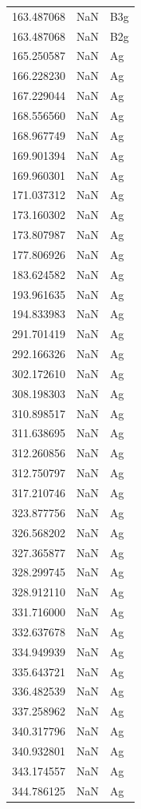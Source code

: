 \begin{longtable}{rrl}
163.487068 & NaN & B3g \\
163.487068 & NaN & B2g \\
165.250587 & NaN & Ag \\
166.228230 & NaN & Ag \\
167.229044 & NaN & Ag \\
168.556560 & NaN & Ag \\
168.967749 & NaN & Ag \\
169.901394 & NaN & Ag \\
169.960301 & NaN & Ag \\
171.037312 & NaN & Ag \\
173.160302 & NaN & Ag \\
173.807987 & NaN & Ag \\
177.806926 & NaN & Ag \\
183.624582 & NaN & Ag \\
193.961635 & NaN & Ag \\
194.833983 & NaN & Ag \\
291.701419 & NaN & Ag \\
292.166326 & NaN & Ag \\
302.172610 & NaN & Ag \\
308.198303 & NaN & Ag \\
310.898517 & NaN & Ag \\
311.638695 & NaN & Ag \\
312.260856 & NaN & Ag \\
312.750797 & NaN & Ag \\
317.210746 & NaN & Ag \\
323.877756 & NaN & Ag \\
326.568202 & NaN & Ag \\
327.365877 & NaN & Ag \\
328.299745 & NaN & Ag \\
328.912110 & NaN & Ag \\
331.716000 & NaN & Ag \\
332.637678 & NaN & Ag \\
334.949939 & NaN & Ag \\
335.643721 & NaN & Ag \\
336.482539 & NaN & Ag \\
337.258962 & NaN & Ag \\
340.317796 & NaN & Ag \\
340.932801 & NaN & Ag \\
343.174557 & NaN & Ag \\
344.786125 & NaN & Ag \\

\end{longtable}
